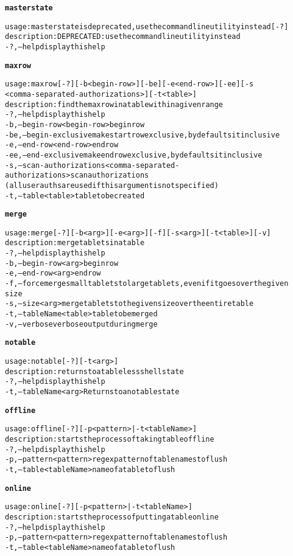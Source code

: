 \begin{alltt}
\textbf{masterstate}

    usage: masterstate is deprecated, use the command line utility instead [-?]
    description: DEPRECATED: use the command line utility instead
      -?,--help  display this help

\textbf{maxrow}

    usage: maxrow [-?] [-b <begin-row>] [-be] [-e <end-row>] [-ee] [-s
              <comma-separated-authorizations>] [-t <table>]
    description: find the max row in a table within a given range
      -?,--help  display this help
      -b,--begin-row <begin-row>  begin row
      -be,--begin-exclusive  make start row exclusive, by defaults it inclusive
      -e,--end-row <end-row>  end row
      -ee,--end-exclusive  make end row exclusive, by defaults it inclusive
      -s,--scan-authorizations <comma-separated-authorizations>  scan authorizations
              (all user auths are used if this argument is not specified)
      -t,--table <table>  table to be created

\textbf{merge}

    usage: merge [-?] [-b <arg>] [-e <arg>] [-f] [-s <arg>] [-t <table>] [-v]
    description: merge tablets in a table
      -?,--help  display this help
      -b,--begin-row <arg>  begin row
      -e,--end-row <arg>  end row
      -f,--force  merge small tablets to large tablets, even if it goes over the given
              size
      -s,--size <arg>  merge tablets to the given size over the entire table
      -t,--tableName <table>  table to be merged
      -v,--verbose  verbose output during merge

\textbf{notable}

    usage: notable [-?] [-t <arg>]
    description: returns to a tableless shell state
      -?,--help  display this help
      -t,--tableName <arg>  Returns to a no table state

\textbf{offline}

    usage: offline [-?] [-p <pattern> | -t <tableName>]
    description: starts the process of taking table offline
      -?,--help  display this help
      -p,--pattern <pattern>  regex pattern of table names to flush
      -t,--table <tableName>  name of a table to flush

\textbf{online}

    usage: online [-?] [-p <pattern> | -t <tableName>]
    description: starts the process of putting a table online
      -?,--help  display this help
      -p,--pattern <pattern>  regex pattern of table names to flush
      -t,--table <tableName>  name of a table to flush


\end{alltt}
